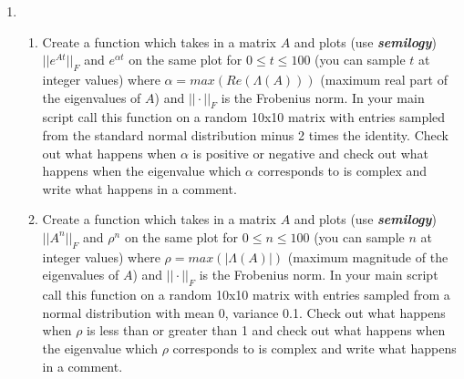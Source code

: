 \documentclass[12pt]{article}
\begin{document}
\begin{enumerate}
\item
\begin{enumerate}
\item Create a function which takes in a matrix $A$ and plots (use \textbf{\textit{semilogy}}) $||e^{At}||_F$ and $e^{\alpha t}$ on the same plot for $0\leq t \leq 100$ (you can sample $t$ at integer values) where $\alpha = max(Re(\Lambda(A)))$ (maximum real part of the eigenvalues of $A$) and $||\cdot||_F$ is the Frobenius norm. In your main script call this function on a random 10x10 matrix with entries sampled from the standard normal distribution minus 2 times the identity. Check out what happens when $\alpha$ is positive or negative and check out what happens when the eigenvalue which $\alpha$ corresponds to is complex and write what happens in a comment.

\item Create a function which takes in a matrix $A$ and plots (use \textbf{\textit{semilogy}}) $||A^n||_F$ and $\rho^n$ on the same plot for $0\leq n \leq 100$ (you can sample $n$ at integer values) where $\rho = max(|\Lambda(A)|)$ (maximum magnitude of the eigenvalues of $A$) and $||\cdot||_F$ is the Frobenius norm. In your main script call this function on a random 10x10 matrix with entries sampled from a normal distribution with mean 0, variance 0.1. Check out what happens when $\rho$ is less than or greater than 1 and check out what happens when the eigenvalue which $\rho$ corresponds to is complex and write what happens in a comment.
\end{enumerate}
\end{enumerate}
\end{document}

